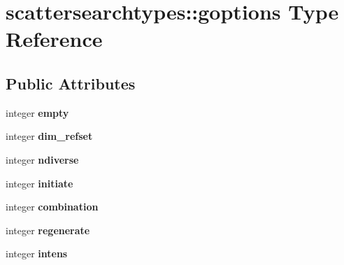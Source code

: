 \hypertarget{structscattersearchtypes_1_1goptions}{\section{scattersearchtypes\-:\-:goptions Type Reference}
\label{structscattersearchtypes_1_1goptions}
}
\subsection*{Public Attributes}
\begin{DoxyCompactItemize}
\item 
\hypertarget{structscattersearchtypes_1_1goptions_aac1be9f86cb06d490930d2e1cae6b037}{integer {\bfseries empty}}\label{structscattersearchtypes_1_1goptions_aac1be9f86cb06d490930d2e1cae6b037}

\item 
\hypertarget{structscattersearchtypes_1_1goptions_ac15e2916b1e615b73d7348813e10a1eb}{integer {\bfseries dim\-\_\-refset}}\label{structscattersearchtypes_1_1goptions_ac15e2916b1e615b73d7348813e10a1eb}

\item 
\hypertarget{structscattersearchtypes_1_1goptions_ae918a4eec2028ea16c910d1ef82a5d27}{integer {\bfseries ndiverse}}\label{structscattersearchtypes_1_1goptions_ae918a4eec2028ea16c910d1ef82a5d27}

\item 
\hypertarget{structscattersearchtypes_1_1goptions_acc1675f147e9666951e9f47fb125b42f}{integer {\bfseries initiate}}\label{structscattersearchtypes_1_1goptions_acc1675f147e9666951e9f47fb125b42f}

\item 
\hypertarget{structscattersearchtypes_1_1goptions_a061034d3d2bb7a1eca47bbea4fc50af5}{integer {\bfseries combination}}\label{structscattersearchtypes_1_1goptions_a061034d3d2bb7a1eca47bbea4fc50af5}

\item 
\hypertarget{structscattersearchtypes_1_1goptions_ad2b3b65505b9f56f4bfec487c05e110e}{integer {\bfseries regenerate}}\label{structscattersearchtypes_1_1goptions_ad2b3b65505b9f56f4bfec487c05e110e}

\item 
\hypertarget{structscattersearchtypes_1_1goptions_aa35cde6df49cf52a5d3b7ca7f6c858bc}{integer {\bfseries intens}}\label{structscattersearchtypes_1_1goptions_aa35cde6df49cf52a5d3b7ca7f6c858bc}


\end{DoxyCompactItemize}
